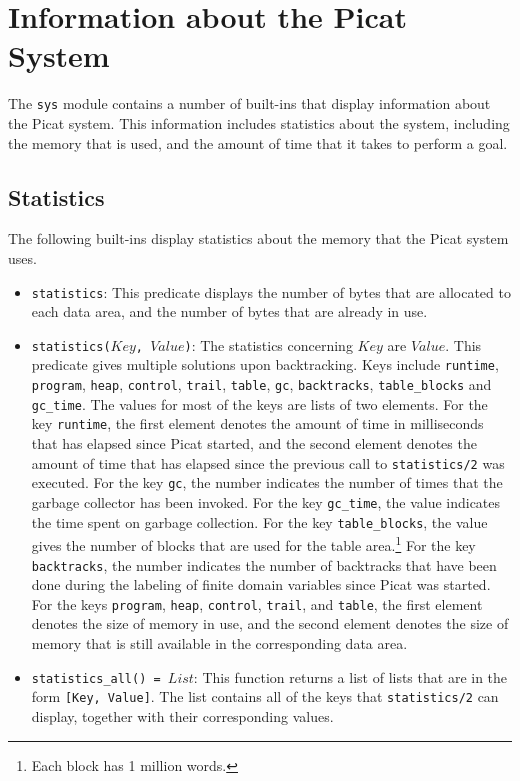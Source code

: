 \section{Information about the Picat System}
The \texttt{sys} module contains a number of built-ins that display information about the Picat system.  This information includes statistics about the system, including the memory that is used, and the amount of time that it takes to perform a goal.

\subsection{Statistics}
The following built-ins display statistics about the memory that the Picat system uses.
\begin{itemize}
\item \texttt{statistics}: This predicate displays the number of bytes that are allocated to each data area, and the number of bytes that are already in use.
\item \texttt{statistics($Key$, $Value$)}: The statistics concerning $Key$ are $Value$.  This predicate gives multiple solutions upon backtracking.  Keys include \texttt{runtime}, \texttt{program}, \texttt{heap}, \texttt{control}, \texttt{trail}, \texttt{table}, \texttt{gc}, \texttt{backtracks}, \texttt{table\_blocks} and \texttt{gc\_time}.  The values for most of the keys are lists of two elements.  For the key \texttt{runtime}, the first element denotes the amount of time in milliseconds that has elapsed since Picat started, and the second element denotes the amount of time that has elapsed since the previous call to \texttt{statistics/2} was executed.  For the key \texttt{gc}, the number indicates the number of times that the garbage collector has been invoked. For the key \texttt{gc\_time}, the value indicates the time spent on garbage collection. For the key \texttt{table\_blocks}, the value gives the number of blocks that are used for the table area.\footnote{Each block has 1 million words.} For the key \texttt{backtracks}, the number indicates the number of backtracks that have been done during the labeling of finite domain variables since Picat was started.  For the keys \texttt{program}, \texttt{heap}, \texttt{control}, \texttt{trail}, and \texttt{table}, the first element denotes the size of memory in use, and the second element denotes the size of memory that is still available in the corresponding data area.
\item \texttt{statistics\_all() = $List$}: This function returns a list of lists that are in the form \texttt{[Key, Value]}.  The list contains all of the keys that \texttt{statistics/2} can display, together with their corresponding values.
\end{itemize} 

